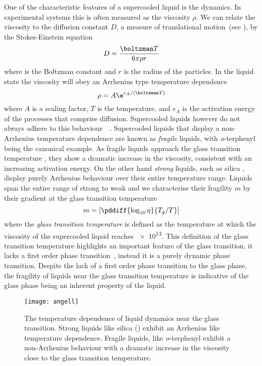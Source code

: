 One of the characteristic features of a supercooled liquid is the dynamics. In experimental systems this is often measured as the viscosity $\rho$. We can relate the viscosity to the diffusion constant $D$, a measure of translational motion~(see ), by the Stokes-Einstein equation~\cite{lubchenko:07}
\begin{equation}
    D = \frac{\boltzman T}{6\pi \rho r}
\end{equation}
where \boltzman{} is the Boltzman constant and $r$ is the radius of the particles. In the liquid state the viscosity will obey an Arrhenius type temperature dependence
\begin{equation}
    \rho = A \e^{e_A/(\boltzman T)}
\end{equation}
where $A$ is a scaling factor, $T$ is the temperature, and $e_A$ is the activation energy of the processes that comprise diffusion. Supercooled liquids however do not always adhere to this behaviour~~\cite{angell:95,lubchenko:07}. Supercooled liquids that display a non-Arrhenius temperature dependence are known as \emph{fragile} liquids, with \emph{o}-terphenyl being the canonical example. As fragile liquids approach the glass transition temperature \si{\Tg}, they show a dramatic increase in the viscosity, consistent with an increasing activation energy. On the other hand \emph{strong} liquids, such as silica , display purely Arrhenius behaviour over their entire temperature range. Liquids span the entire range of strong to weak and we characterise their fragility $m$ by their gradient at the glass transition temperature
\begin{equation}
    m = \left [ \pddiff{\log_{10}\eta}{T_g/T} \right ]
\end{equation}
where the \emph{glass transition temperature} \si{\Tg} is defined as the temperature at which the viscosity of the supercooled liquid reaches \SI{e13}{\poise}. This definition of the glass transition temperature highlights an important feature of the glass transition, it lacks a first order phase transition~\cite{santen:00}, instead it is a purely dynamic phase transition. Despite the lack of a first order phase transition to the glass phase, the fragility of liquids near the glass transition temperature is indicative of the glass phase being an inherent property of the liquid.

\begin{figure}
    \centering
    \texttt{[image: angell]}
    \caption{The temperature dependence of liquid dynamics near the glass transition. Strong liquids like silica () exhibit an Arrhenius like temperature dependence. Fragile liquids, like {\em o}-terphenyl exhibit a non-Arrhenius behaviour with a dramatic increase in the viscosity close to the glass transition temperature.}
    \label{fig:angell}
\end{figure}

